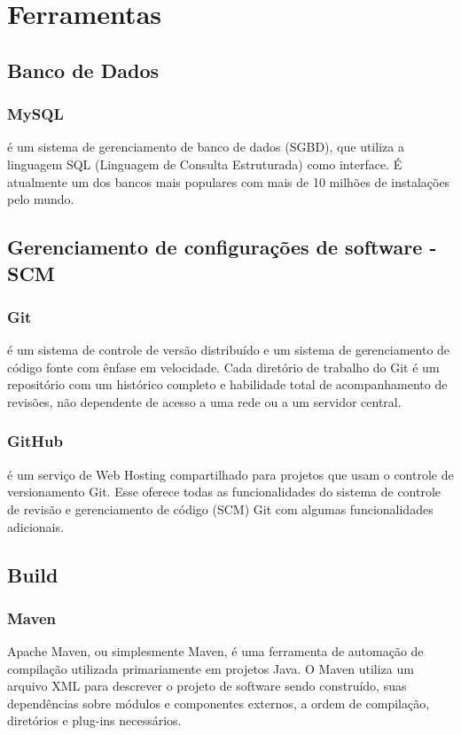 \chapter{Ferramentas}

    \section{Banco de Dados}

	\subsection{MySQL} é um sistema de gerenciamento de banco de dados (SGBD),
	que utiliza a linguagem SQL (Linguagem de Consulta Estruturada) como
	interface. É atualmente um dos bancos mais populares com mais de 10
	milhões de instalações pelo mundo.

    \section{Gerenciamento de configurações de software - SCM}

	\subsection{Git} é um sistema de controle de versão distribuído e um
	sistema de gerenciamento de código fonte com ênfase em velocidade.
	Cada diretório de trabalho do Git é um repositório com um histórico
	completo e habilidade total de acompanhamento de revisões, não
	dependente de acesso a uma rede ou a um servidor central.

	\subsection{GitHub} é um serviço de Web Hosting compartilhado
	para projetos que usam o controle de versionamento Git.
	Esse oferece todas as funcionalidades do sistema de controle de
	revisão e gerenciamento de código (SCM) Git com algumas
	funcionalidades adicionais.

    \section{Build}

	\subsection{Maven} Apache Maven, ou simplesmente Maven, é uma
	ferramenta de automação de compilação utilizada primariamente
	em projetos Java. O Maven utiliza um arquivo XML para descrever
	o projeto de software sendo construído, suas dependências sobre
	módulos e componentes externos, a ordem de compilação,
	diretórios e plug-ins necessários.

